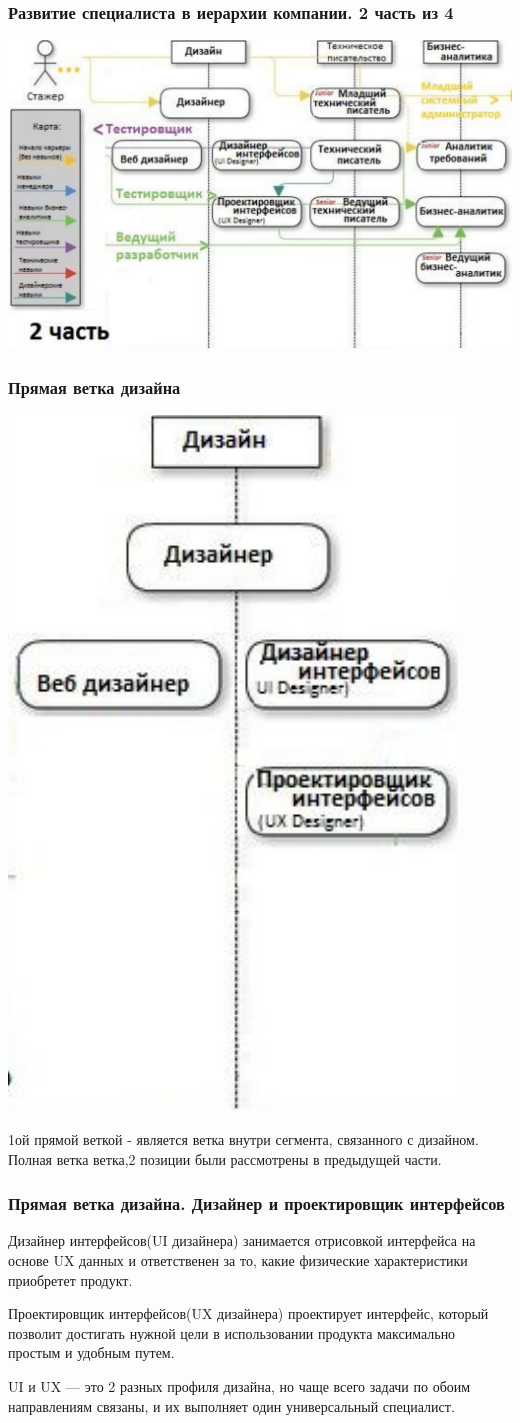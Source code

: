 \documentclass{../industrial-development}
\begin{document}
\begin{frame} \frametitle{Развитие  специалиста в иерархии компании. 2 часть из 4 }
  \centerline{\includegraphics[width=1\linewidth]{11-IT-specialist's-way/sch12.pdf}}
\end{frame}

\begin{frame} \frametitle{Прямая ветка дизайна }
  \centerline{\includegraphics[width=0.42\linewidth]{11-IT-specialist's-way/sch12a.pdf}}
\end{frame}

\lecturenotes
 1ой прямой веткой  - является ветка внутри сегмента, связанного с дизайном. Полная ветка ветка,2 позиции были рассмотрены в предыдущей части.


\begin{frame} \frametitle{Прямая ветка дизайна. Дизайнер и проектировщик интерфейсов }
 \begin{block}{}
 Дизайнер интерфейсов(UI дизайнера) занимается  отрисовкой интерфейса на основе UX данных и ответственен за то, какие физические характеристики приобретет продукт.
  \end{block}
 \begin{block}{}
Проектировщик интерфейсов(UX дизайнера) проектирует интерфейс, который позволит достигать нужной цели в использовании продукта максимально простым и удобным путем.
  \end{block}
   \begin{block}{}
 UI и UX  — это 2 разных профиля дизайна, но чаще всего задачи по обоим направлениям связаны, и их выполняет один универсальный специалист.
  \end{block}
\end{frame}
\end{document}

